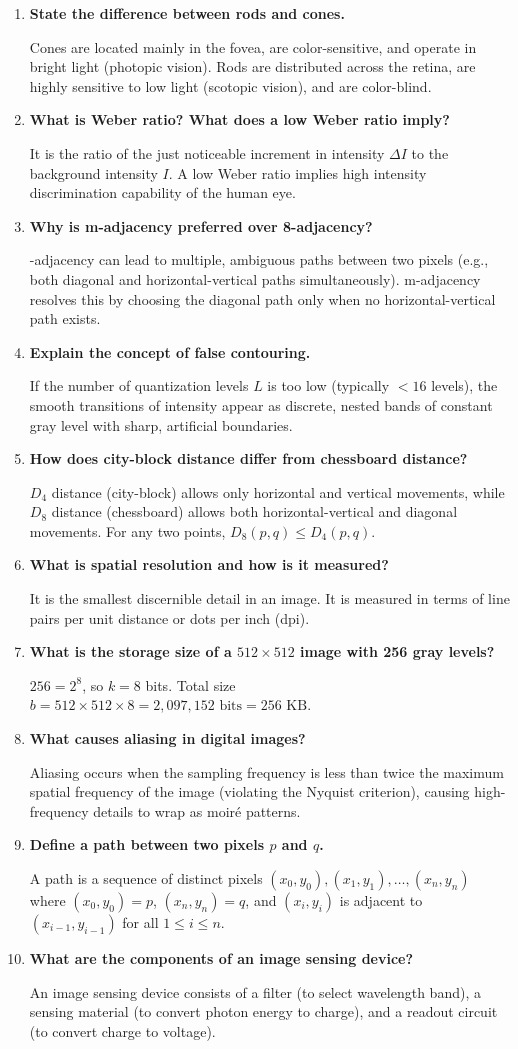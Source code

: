 \documentclass[12pt,a4paper]{article}
\newcommand{\Q}[1]{\textbf{#1}\par\noindent\ignorespaces}
\begin{document}
\begin{tcolorbox}[exambox, title={\textbf{Frequently Asked / Viva Questions}}]
\begin{enumerate}[leftmargin=*, itemsep=3.5pt, label=\arabic*.]
  \item \Q{State the difference between rods and cones.} Cones are located mainly in the fovea, are color-sensitive, and operate in bright light (photopic vision). Rods are distributed across the retina, are highly sensitive to low light (scotopic vision), and are color-blind.
  \item \Q{What is Weber ratio? What does a low Weber ratio imply?} It is the ratio of the just noticeable increment in intensity $\Delta I$ to the background intensity $I$. A low Weber ratio implies high intensity discrimination capability of the human eye.
  \item \Q{Why is m-adjacency preferred over 8-adjacency?} 8-adjacency can lead to multiple, ambiguous paths between two pixels (e.g., both diagonal and horizontal-vertical paths simultaneously). m-adjacency resolves this by choosing the diagonal path only when no horizontal-vertical path exists.
  \item \Q{Explain the concept of false contouring.} If the number of quantization levels $L$ is too low (typically $< 16$ levels), the smooth transitions of intensity appear as discrete, nested bands of constant gray level with sharp, artificial boundaries.
  \item \Q{How does city-block distance differ from chessboard distance?} $D_4$ distance (city-block) allows only horizontal and vertical movements, while $D_8$ distance (chessboard) allows both horizontal-vertical and diagonal movements. For any two points, $D_8(p,q) \le D_4(p,q)$.
  \item \Q{What is spatial resolution and how is it measured?} It is the smallest discernible detail in an image. It is measured in terms of line pairs per unit distance or dots per inch (dpi).
  \item \Q{What is the storage size of a $512 \times 512$ image with 256 gray levels?} $256 = 2^8$, so $k = 8$ bits. Total size $b = 512 \times 512 \times 8 = 2,097,152 \text{ bits} = 256 \text{ KB}$.
  \item \Q{What causes aliasing in digital images?} Aliasing occurs when the sampling frequency is less than twice the maximum spatial frequency of the image (violating the Nyquist criterion), causing high-frequency details to wrap as moir\'{e} patterns.
  \item \Q{Define a path between two pixels $p$ and $q$.} A path is a sequence of distinct pixels $(x_0, y_0), (x_1, y_1), \dots, (x_n, y_n)$ where $(x_0, y_0) = p$, $(x_n, y_n) = q$, and $(x_i, y_i)$ is adjacent to $(x_{i-1}, y_{i-1})$ for all $1 \le i \le n$.
  \item \Q{What are the components of an image sensing device?} An image sensing device consists of a filter (to select wavelength band), a sensing material (to convert photon energy to charge), and a readout circuit (to convert charge to voltage).
\end{enumerate}
\end{tcolorbox}
\end{document}
